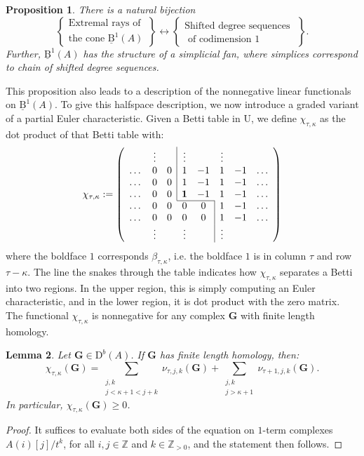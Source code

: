 \documentclass[12pt]{amsart}
\newtheorem{lemma}{Lemma}[section]
\newtheorem{prop}[lemma]{Proposition}
\theoremstyle{definition}
\theoremstyle{remark}
\newcommand{\ZZ}{\mathbb{Z}}
\newcommand{\UU}{\mathrm{U}}
\newcommand{\Gbull}{\mathbf{G}}
\newcommand{\DD}{\mathrm{D}}
\newcommand{\BBQ}{\underline{\mathrm{B}}}
\begin{document}
\begin{prop}\label{prop:conePP0}
There is a natural bijection
\[
\left\{
\begin{matrix}
\text{Extremal rays of }\\
\text{the cone } \BBQ^{1}(A)
\end{matrix}
\right\}
\longleftrightarrow
\left\{
\begin{matrix}
\text{Shifted degree sequences }\\
\text{ of codimension $1$}
\end{matrix}
\right\}.
\]
Further, $\BBQ^1(A)$ has the structure of a simplicial fan, where simplices correspond to chain of shifted degree sequences.  
\end{prop}
This proposition also leads to a description of the nonnegative linear functionals on $\BBQ^1(A)$.  To give this halfspace description, we now introduce a graded variant of a partial Euler characteristic.  Given a Betti table in $\UU$, we define $\chi_{\tau,\kappa}$ as the dot product of that Betti table with:
\[
\chi_{\tau,\kappa}:=
\left(
\begin{array}{cccccccc}
 & \vdots& &\multicolumn{1}{|c}{\vdots}&& \vdots&&\\
\dots&0&0&\multicolumn{1}{|c}{1}&-1&1&-1&\dots\\
\dots&0&0&\multicolumn{1}{|c}{1}&-1&1&-1&\dots\\
\dots&0&0&\multicolumn{1}{|c}{\mathbf{1}}&-1&1&-1&\dots\\ \cline{4-5}
\dots&0&0&0&0&\multicolumn{1}{|c}{1}&-1&\dots\\
\dots&0&0&0&0&\multicolumn{1}{|c}{1}&-1&\dots\\
& \vdots&&\vdots&& \multicolumn{1}{|c}{\vdots}&&\\
\end{array}
\right)
\]
where the boldface $1$ corresponds $\beta_{\tau,\kappa}$, i.e. the boldface $1$ is in column $\tau$ and row $\tau-\kappa$. The line the snakes through
the table indicates how $\chi_{\tau,\kappa}$ separates a Betti into two regions.  In the upper region, this is simply computing an Euler characteristic, and in the lower region, it is dot product with the zero matrix.
The functional $\chi_{\tau,\kappa}$ is nonnegative for any complex $\Gbull$ with finite length homology.  
\begin{lemma}\label{lem:chi nonneg}
Let $\Gbull\in \DD^b(A)$.  If $\Gbull$ has finite length homology, then:
\[
\chi_{\tau,\kappa}(\Gbull)=\sum_{\substack{j,k \\ j< \kappa+1<j+k}} \nu_{\tau,j,k}(\Gbull) + \sum_{\substack{j,k \\ j> \kappa+1}} \nu_{\tau+1,j,k}(\Gbull).
\]
In particular, $\chi_{\tau,\kappa}(\Gbull)\geq 0$.
\end{lemma}
\begin{proof}
It suffices to evaluate both sides of the equation on $1$-term complexes $A(i)[j]/t^k$, for all $i,j\in \ZZ$ and $k\in \ZZ_{>0}$, and the statement then follows.
\end{proof}
\end{document}
